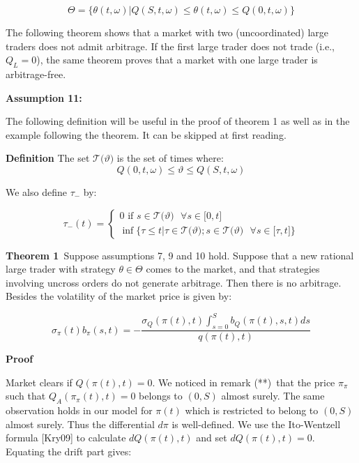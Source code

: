 \documentclass{article}
\begin{document}
\begin{equation*}
\Theta =\{\theta (t,\omega )|Q(S,t,\omega )\leq \theta (t,\omega )\leq
Q(0,t,\omega )\}
\end{equation*}

The following theorem shows that a market with two (uncoordinated) large
traders does not admit arbitrage. If the first large trader does not trade
(i.e., $Q_{L}=0$), the same theorem proves that a market with one large
trader is arbitrage-free.

\bigskip

\textbf{Assumption 11:}

\bigskip

The following definition will be useful in the proof of theorem 1 as well as
in the example following the theorem. It can be skipped at first reading.

\bigskip

\textbf{Definition} The set $\mathcal{T(}\vartheta )$ is the set of times
where:%
\begin{equation*}
Q(0,t,\omega )\leq \vartheta \leq Q(S,t,\omega )
\end{equation*}

We also define $\tau _{-}$ by:

\begin{equation*}
\tau _{-}(t)=\left\{ 
\begin{array}{c}
0\text{ if }s\in \mathcal{T(}\vartheta )\text{ }\forall s\in \lbrack 0,t]%
\text{ \ \ \ \ \ \ \ \ \ \ \ \ \ \ \ \ \ \ \ \ \ \ \ } \\ 
\inf \{\tau \leq t|\tau \in \mathcal{T(}\vartheta );s\in \mathcal{T(}%
\vartheta )\text{ }\forall s\in \lbrack \tau ,t]\}%
\end{array}%
\right.
\end{equation*}%
\bigskip

\textbf{Theorem 1}\ Suppose assumptions 7, 9 and 10 hold. Suppose that a new
rational large trader with strategy $\theta \in \Theta $ comes to the
market, and that strategies involving uncross orders do not generate
arbitrage. Then there is no arbitrage. Besides the volatility of the market
price is given by:

\begin{equation}
\sigma _{\pi }(t)b_{\pi }(s,t)=-\frac{\sigma _{Q}(\pi
(t),t)\int_{s=0}^{S}b_{Q}(\pi (t),s,t)ds}{q(\pi (t),t)}  \label{vovol}
\end{equation}

\textbf{Proof }

Market clears if $Q(\pi (t),t)=0$. We noticed in remark (**)\ that the price 
$\pi _{\pi }$ such that $Q_{A}(\pi _{\pi }(t),t)=0$ belongs to $(0,S)$
almost surely. The same observation holds in our model for $\pi (t)$ which
is restricted to belong to $(0,S)$ almost surely. Thus the differential $%
d\pi $ is well-defined. We use the Ito-Wentzell formula [Kry09] to calculate 
$dQ(\pi (t),t)$ and set $dQ(\pi (t),t)=0$. Equating the drift part gives:
\end{document}

